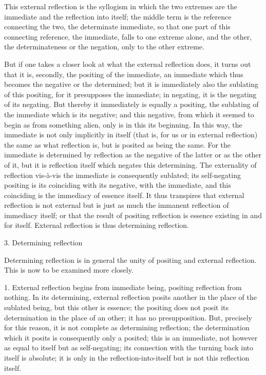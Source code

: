This external reflection is the syllogism in which
the two extremes are the immediate and the reflection into itself;
the middle term is the reference connecting the two,
the determinate immediate, so that one part of this connecting reference,
the immediate, falls to one extreme alone, and the other,
the determinateness or the negation, only to the other extreme.

But if one takes a closer look at what the external reflection does,
it turns out that it is, secondly, the positing of the immediate,
an immediate which thus becomes the negative or the determined;
but it is immediately also the sublating of this positing,
for it presupposes the immediate;
in negating, it is the negating of its negating.
But thereby it immediately is equally a positing,
the sublating of the immediate which is its negative;
and this negative, from which it seemed to begin
as from something alien,
only is in this its beginning.
In this way, the immediate is not only implicitly in itself
(that is, for us or in external reflection)
the same as what reflection is,
but is posited as being the same.
For the immediate is determined by reflection as
the negative of the latter or as the other of it,
but it is reflection itself which negates this determining.
The externality of reflection vis-à-vis
the immediate is consequently sublated;
its self-negating positing is its coinciding
with its negative, with the immediate,
and this coinciding is the immediacy of essence itself.
It thus transpires that external reflection is not external
but is just as much the immanent reflection of immediacy itself;
or that the result of positing reflection is
essence existing in and for itself.
External reflection is thus determining reflection.

3. Determining reflection

Determining reflection is in general
the unity of positing and external reflection.
This is now to be examined more closely.

1. External reflection begins from immediate being,
positing reflection from nothing.
In its determining, external reflection posits another in the
place of the sublated being, but this other is essence;
the positing does not posit its determination in the place of an other;
it has no presupposition.
But, precisely for this reason,
it is not complete as determining reflection;
the determination which it posits is consequently only a posited;
this is an immediate, not however as equal to itself
but as self-negating;
its connection with the turning back into itself is absolute;
it is only in the reflection-into-itself
but is not this reflection itself.

